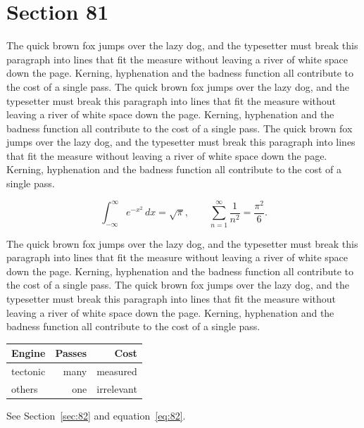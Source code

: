 \documentclass{article}
\begin{document}
\section{Section 81}
\label{sec:81}
The quick brown fox jumps over the lazy dog, and the typesetter must break this paragraph into lines that fit the measure without leaving a river of white space down the page. Kerning, hyphenation and the badness function all contribute to the cost of a single pass. The quick brown fox jumps over the lazy dog, and the typesetter must break this paragraph into lines that fit the measure without leaving a river of white space down the page. Kerning, hyphenation and the badness function all contribute to the cost of a single pass. The quick brown fox jumps over the lazy dog, and the typesetter must break this paragraph into lines that fit the measure without leaving a river of white space down the page. Kerning, hyphenation and the badness function all contribute to the cost of a single pass. 

\begin{equation}\label{eq:81}
\int_{-\infty}^{\infty} e^{-x^{2}}\,dx = \sqrt{\pi}, \qquad
\sum_{n=1}^{\infty} \frac{1}{n^{2}} = \frac{\pi^{2}}{6}.
\end{equation}

The quick brown fox jumps over the lazy dog, and the typesetter must break this paragraph into lines that fit the measure without leaving a river of white space down the page. Kerning, hyphenation and the badness function all contribute to the cost of a single pass. The quick brown fox jumps over the lazy dog, and the typesetter must break this paragraph into lines that fit the measure without leaving a river of white space down the page. Kerning, hyphenation and the badness function all contribute to the cost of a single pass. 

\begin{center}
\begin{tabular}{lrr}
\toprule
Engine & Passes & Cost \\
\midrule
tectonic & many & measured \\
others & one & irrelevant \\
\bottomrule
\end{tabular}
\end{center}

See Section~\ref{sec:82} and equation~\eqref{eq:82}.
\end{document}
